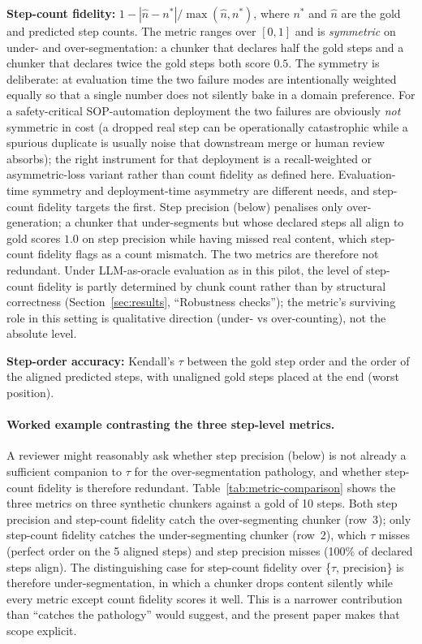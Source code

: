 \documentclass[make,article,submit,oneauthor,pdftex]{Definitions/mdpi}
\begin{document}
\textbf{Step-count fidelity:}
$1-|\hat{n}-n^{*}|/\max(\hat{n},n^{*})$, where $n^{*}$ and $\hat{n}$ are
the gold and predicted step counts. The metric ranges over $[0,1]$ and
is \emph{symmetric} on under- and over-segmentation: a chunker that
declares half the gold steps and a chunker that declares twice the
gold steps both score $0.5$. The symmetry is deliberate: at
evaluation time the two failure modes are intentionally weighted
equally so that a single number does not silently bake in a domain
preference. For a safety-critical SOP-automation deployment the two
failures are obviously \emph{not} symmetric in cost (a dropped real
step can be operationally catastrophic while a spurious duplicate is
usually noise that downstream merge or human review absorbs); the
right instrument for that deployment is a recall-weighted or
asymmetric-loss variant rather than count fidelity as defined here.
Evaluation-time symmetry and deployment-time asymmetry are different
needs, and step-count fidelity targets the first. Step precision
(below) penalises only over-generation; a chunker that under-segments
but whose declared steps all align to gold scores $1.0$ on step
precision while having missed real content, which step-count fidelity
flags as a count mismatch. The two metrics are therefore not
redundant. Under LLM-as-oracle evaluation as in this pilot, the level
of step-count fidelity is partly determined by chunk count rather
than by structural correctness (Section~\ref{sec:results},
``Robustness checks''); the metric's surviving role in this setting
is qualitative direction (under- vs over-counting), not the absolute
level.

\textbf{Step-order accuracy:} Kendall's $\tau$ between the gold step
order and the order of the aligned predicted steps, with unaligned
gold steps placed at the end (worst position).

\paragraph{Worked example contrasting the three step-level metrics.}
A reviewer might reasonably ask whether step precision (below) is not
already a sufficient companion to $\tau$ for the over-segmentation
pathology, and whether step-count fidelity is therefore redundant.
Table~\ref{tab:metric-comparison} shows the three metrics on three
synthetic chunkers against a gold of 10 steps. Both step precision
and step-count fidelity catch the over-segmenting chunker (row~3);
only step-count fidelity catches the under-segmenting chunker
(row~2), which $\tau$ misses (perfect order on the 5 aligned steps)
and step precision misses (100\% of declared steps align). The
distinguishing case for step-count fidelity over \{$\tau$, precision\}
is therefore under-segmentation, in which a chunker drops content
silently while every metric except count fidelity scores it well.
This is a narrower contribution than ``catches the pathology'' would
suggest, and the present paper makes that scope explicit.
\end{document}
